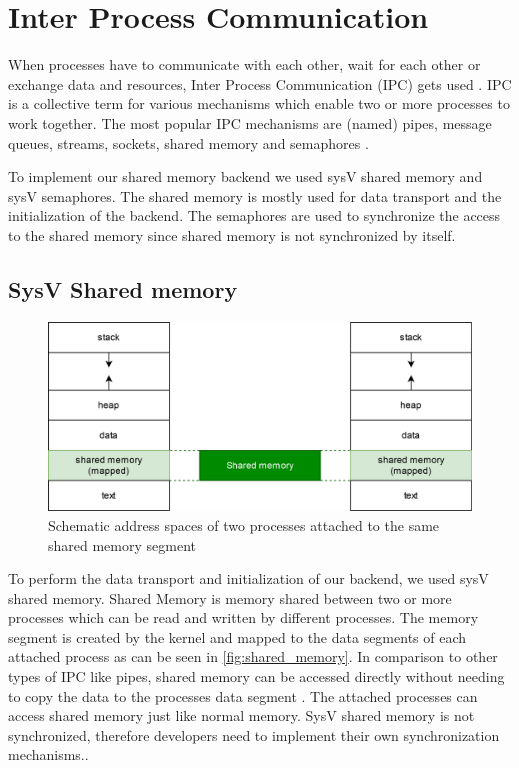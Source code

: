 \section{Inter Process Communication}

When processes have to communicate with each other, wait for each other or exchange data and resources, Inter Process Communication (IPC) gets used \cite{unix-programming}. 
IPC is a collective term for various mechanisms which enable two or more processes to work together. 
The most popular IPC mechanisms are (named) pipes, message queues, streams, sockets, shared memory and semaphores \cite{unix-programming}.

To implement our shared memory backend we used sysV shared memory and sysV semaphores. 
The shared memory is mostly used for data transport and the  initialization of the backend. 
The semaphores are used to synchronize the access to the shared memory since shared memory is not synchronized by itself.

\subsection{SysV Shared memory}\label{section:shared_memory}

\begin{figure}[h]
	\centering
	\includegraphics[width=0.75\columnwidth]{figures/shared_memory.png}
	\caption{Schematic address spaces of two processes attached to the same shared memory segment\cite{shared-memory}}
	\label{fig:shared_memory}
\end{figure}

To perform the data transport and initialization of our backend, we used sysV shared memory.
Shared Memory is memory shared between two or more processes which can be read and written by different processes. 
The memory segment is created by the kernel and mapped to the data segments of each attached process as can be seen in \autoref{fig:shared_memory}. 
In comparison to other types of IPC like pipes, shared memory can be accessed directly without needing to copy the data to the processes data segment \cite{unix-programming}.
The attached processes can access shared memory just like normal memory.
SysV shared memory is not synchronized, therefore developers need to implement their own synchronization mechanisms.\cite{unix-programming}.

